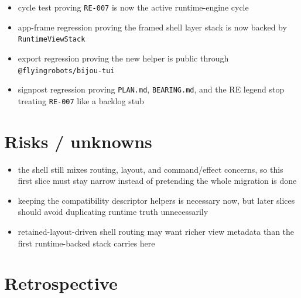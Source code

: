 \begin{itemize}
\tightlist
\item
  cycle test proving \texttt{R\allowbreak{}E\allowbreak{}-\allowbreak{}0\allowbreak{}0\allowbreak{}7} is now the active runtime-engine cycle
\item
  app-frame regression proving the framed shell layer stack is now backed by \texttt{R\allowbreak{}u\allowbreak{}n\allowbreak{}t\allowbreak{}i\allowbreak{}m\allowbreak{}e\allowbreak{}V\allowbreak{}i\allowbreak{}e\allowbreak{}w\allowbreak{}S\allowbreak{}t\allowbreak{}a\allowbreak{}c\allowbreak{}k}
\item
  export regression proving the new helper is public through \texttt{@\allowbreak{}f\allowbreak{}l\allowbreak{}y\allowbreak{}i\allowbreak{}n\allowbreak{}g\allowbreak{}r\allowbreak{}o\allowbreak{}b\allowbreak{}o\allowbreak{}t\allowbreak{}s\allowbreak{}/\allowbreak{}b\allowbreak{}i\allowbreak{}j\allowbreak{}o\allowbreak{}u\allowbreak{}-\allowbreak{}t\allowbreak{}u\allowbreak{}i}
\item
  signpost regression proving \texttt{P\allowbreak{}L\allowbreak{}A\allowbreak{}N\allowbreak{}.\allowbreak{}m\allowbreak{}d}, \texttt{B\allowbreak{}E\allowbreak{}A\allowbreak{}R\allowbreak{}I\allowbreak{}N\allowbreak{}G\allowbreak{}.\allowbreak{}m\allowbreak{}d}, and the RE legend stop treating \texttt{R\allowbreak{}E\allowbreak{}-\allowbreak{}0\allowbreak{}0\allowbreak{}7} like a backlog stub
\end{itemize}

\section{Risks / unknowns}\label{record-155-risks-unknowns}

\begin{itemize}
\tightlist
\item
  the shell still mixes routing, layout, and command/effect concerns, so this first slice must stay narrow instead of pretending the whole migration is done
\item
  keeping the compatibility descriptor helpers is necessary now, but later slices should avoid duplicating runtime truth unnecessarily
\item
  retained-layout-driven shell routing may want richer view metadata than the first runtime-backed stack carries here
\end{itemize}

\section{Retrospective}\label{record-155-retrospective}

